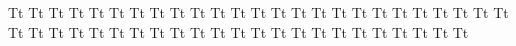 \documentclass{worksheet}
\begin{document}
\begin{drillsheet}
\calligra
Tt Tt Tt Tt Tt Tt Tt Tt Tt Tt Tt Tt Tt Tt Tt Tt Tt Tt Tt Tt Tt Tt Tt Tt Tt Tt Tt Tt Tt Tt Tt Tt Tt Tt Tt Tt Tt Tt Tt Tt Tt Tt Tt Tt Tt Tt Tt Tt
\end{drillsheet}
\end{document}

